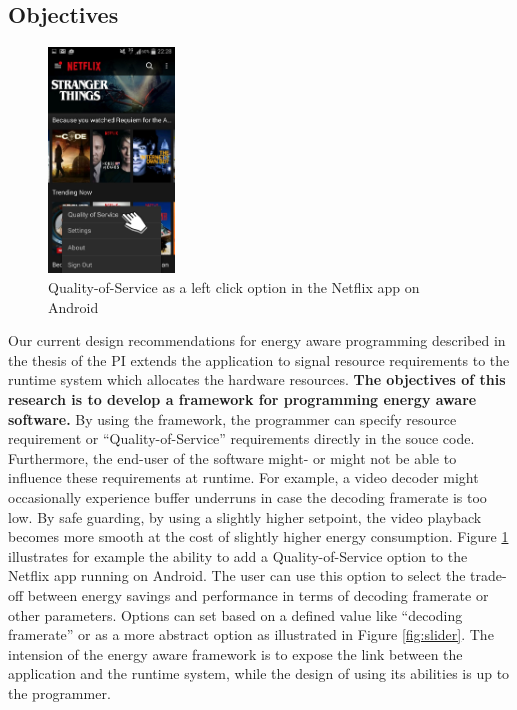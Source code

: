 \documentclass{article}
\begin{document}
\subsection{Objectives}
\begin{figure}
  \begin{center}
    \includegraphics[width=0.3\textwidth]{fig/netflix.png}
  \end{center}
  \caption{Quality-of-Service as a left click option in the Netflix app on Android}
  \label{fig:netflix}
  \vspace{-2cm}
\end{figure}
Our current design recommendations for energy aware programming described in the thesis of the PI extends the application to signal resource requirements to the runtime system which allocates the hardware resources.
\textbf{The objectives of this research is to develop a framework for programming energy aware software.}
By using the framework, the programmer can specify resource requirement or ``Quality-of-Service'' requirements directly in the souce code.
Furthermore, the end-user of the software might- or might not be able to influence these requirements at runtime.
For example, a video decoder might occasionally experience buffer underruns in case the decoding framerate is too low.
By safe guarding, by using a slightly higher setpoint, the video playback becomes more smooth at the cost of slightly higher energy consumption.
Figure \ref{fig:netflix} illustrates for example the ability to add a Quality-of-Service option to the Netflix app running on Android.
The user can use this option to select the trade-off between energy savings and performance in terms of decoding framerate or other parameters. 
Options can set based on a defined value like ``decoding framerate'' or as a more abstract option as illustrated in Figure \ref{fig:slider}. 
The intension of the energy aware framework is to expose the link between the application and the runtime system, while the design of using its abilities is up to the programmer.
\end{document}
